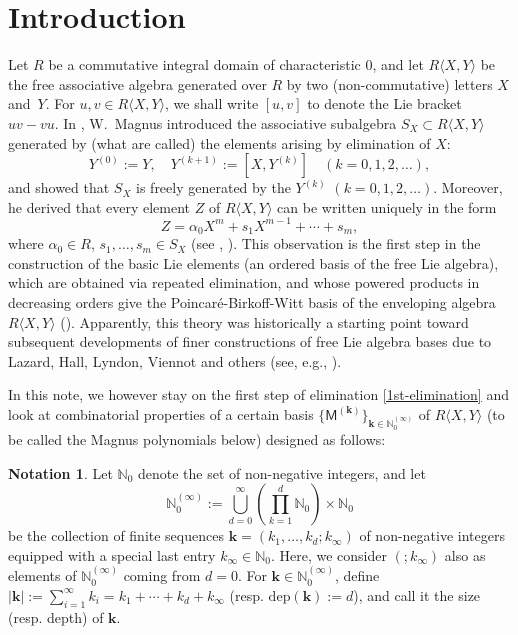 \documentclass[10pt]{article}
\theoremstyle{definition}
\newtheorem{Notation}[Theorem]{Notation}
\theoremstyle{remark}
\def\bk{{\mathbf{k}}}
\def\MM{{\mathsf{M}}}
\def\dep{\mathrm{dep}}
\def\N{{\mathbb N}}
\def\la{\langle}
\def\ra{\rangle}
\begin{document}
\section{Introduction}

Let $R$ be a commutative integral domain of characteristic 0, and let $R\la X,Y\ra$ be
the free associative algebra generated over $R$ by two (non-commutative) 
letters $X$ and~$Y$.
For $u,v\in R\la X,Y\ra$, we shall write $[u,v]$
to denote the Lie bracket $uv-vu$.
In \cite{M37}, W.~Magnus introduced the associative subalgebra 
$S_X\subset R\la X,Y\ra$ generated by 
(what are called) the elements arising by elimination of $X$:
\begin{equation}
Y^{(0)}:=Y, \quad
Y^{(k+1)}:=[X,Y^{(k)}] \quad
(k=0,1,2,\dots),
\end{equation}
and showed that $S_X$ is freely generated by the $Y^{(k)}$
$(k=0,1,2,\dots)$.
Moreover, he derived that every element $Z$ of  $R\la X,Y\ra$ can be
written uniquely in the form
\begin{equation} \label{1st-elimination}
Z=\alpha_0 X^m +s_1 X^{m-1}+\cdots+s_m,
\end{equation}
where $\alpha_0\in R$, $s_1,\dots, s_m\in S_X$
(see \cite[Hilfssatz 2]{M37}, \cite[Lemma 5.6]{MKS}).
This observation is the first step in the construction 
of the basic Lie elements (an ordered basis of the free Lie algebra), 
which are obtained via repeated elimination, and
whose powered products in decreasing orders give 
the Poincar\'e-Birkoff-Witt
basis of the enveloping algebra~$R\la X,Y\ra$ (\cite[Theorem~5.8]{MKS}).
Apparently, this theory was historically a starting point 
toward subsequent developments of
finer constructions of free Lie algebra bases 
due to Lazard, Hall, Lyndon, Viennot and others
(see, e.g., \cite[Notes 4.5, 5.7]{Reu}). 

In this note, we however stay on the first step of elimination 
\eqref{1st-elimination} and 
look at combinatorial properties of a certain basis 
$\{\MM^{(\bk)}\}_{\bk\in \N_0^{(\infty)}}$ of $R\la X,Y\ra$
(to be called the Magnus polynomials below)
designed as follows: 

\begin{Notation} 
Let $\N_0$ denote the set of non-negative integers, and 
let 
$$
\N_0^{(\infty)}:=\bigcup_{d=0}^\infty
\left(
\prod_{k=1}^{d}\N_0\right)
\times \N_0 
$$ 
be the collection of finite sequences 
$
\bk=(k_1,\dots,k_d; k_\infty)
$
of non-negative integers equipped 
with a special last entry $k_\infty\in \N_0$. 
Here, we consider $(;k_\infty)$ also as elements of 
$\N_0^{(\infty)}$ coming from $d=0$.
For $\bk\in \N_0^{(\infty)}$, define
$|\bk|:=\sum_{i=1}^\infty k_i=k_1+\cdots+k_d+k_\infty$ 
(resp. $\dep(\bk):=d$),
and call it the size (resp. depth) of $\bk$.
\end{Notation}
\end{document}
